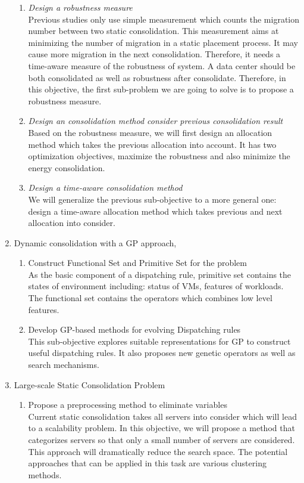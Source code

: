 \begin{enumerate}
	\begin{enumerate}
		\item \emph{Design a robustness measure} \\
 		Previous studies only use simple measurement which counts the migration number between two static consolidation. This measurement aims at minimizing the number of migration in a static placement process. It may cause more migration in the next consolidation. Therefore, it needs a time-aware measure of the robustness of system. A data center should be both consolidated as well as robustness after consolidate. Therefore, in this objective, the first sub-problem we are going to solve is to propose a robustness measure.
		\item \emph{Design an consolidation method consider previous consolidation result} \\
		Based on the robustness measure, we will first design an allocation method 
		which takes the previous allocation into account. It has two optimization objectives, maximize the robustness and also minimize the energy consolidation.
		\item \emph{Design a time-aware consolidation method}\\
		We will generalize the previous sub-objective to a more general one: design a time-aware allocation method which takes previous and next allocation into consider.
	\end{enumerate}

	\item  Dynamic consolidation with a GP approach,
	\begin{enumerate}
		\item Construct Functional Set and Primitive Set for the problem \\
		As the basic component of a dispatching rule, primitive set contains the states of environment including: status of VMs, features of workloads. The functional set 
		contains the operators which combines low level features.

		\item Develop GP-based methods for evolving Dispatching rules \\
		This sub-objective explores suitable representations for GP to construct useful dispatching rules. It also proposes new genetic operators as well as search mechanisms.
	\end{enumerate}

	\item Large-scale Static Consolidation Problem
	\begin{enumerate}
		\item Propose a preprocessing method to eliminate variables \\
		Current static consolidation takes all servers into consider which will lead to a scalability problem. In this objective, we will propose a method that categorizes servers so that only a small number of servers are considered. This approach will dramatically reduce the search space. The potential approaches that can be applied in this task are various clustering methods.
	\end{enumerate}
\end{enumerate}


